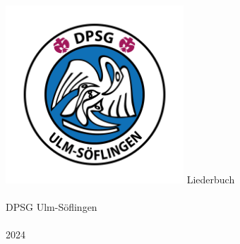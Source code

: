 \begin{center}
    \includegraphics[width=0.5\textwidth]{../img/logo.png}
    \vfill
    \huge{Liederbuch} \\
    \large{
        \ \\
        DPSG Ulm-Söflingen \\
        \ \\ 
        2024
    }
\end{center}
